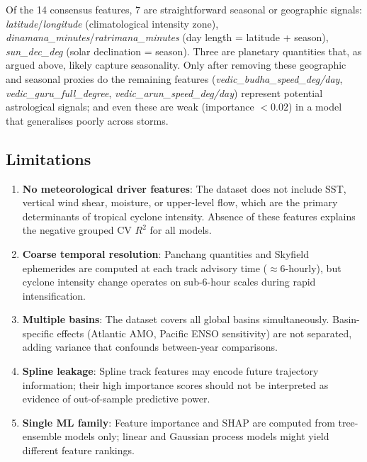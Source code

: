 \documentclass[12pt,a4paper]{article}
\begin{document}
Of the 14 consensus features, 7 are straightforward seasonal or geographic signals:
\textit{latitude}/\textit{longitude} (climatological intensity zone),
\textit{dinamana\_minutes}/\textit{ratrimana\_minutes} (day length = latitude + season),
\textit{sun\_dec\_deg} (solar declination = season).
Three are planetary quantities that, as argued above, likely capture seasonality.
Only after removing these geographic and seasonal proxies do the remaining features
(\textit{vedic\_budha\_speed\_deg/day}, \textit{vedic\_guru\_full\_degree},
\textit{vedic\_arun\_speed\_deg/day}) represent potential astrological signals;
and even these are weak (importance $< 0.02$) in a model that generalises poorly
across storms.

\subsection{Limitations}

\begin{enumerate}
  \item \textbf{No meteorological driver features}: The dataset does not include
        SST, vertical wind shear, moisture, or upper-level flow, which are the
        primary determinants of tropical cyclone intensity. Absence of these features
        explains the negative grouped CV $R^2$ for all models.
  \item \textbf{Coarse temporal resolution}: Panchang quantities and Skyfield
        ephemerides are computed at each track advisory time ($\approx 6$-hourly),
        but cyclone intensity change operates on sub-6-hour scales during rapid
        intensification.
  \item \textbf{Multiple basins}: The dataset covers all global basins simultaneously.
        Basin-specific effects (Atlantic AMO, Pacific ENSO sensitivity) are not
        separated, adding variance that confounds between-year comparisons.
  \item \textbf{Spline leakage}: Spline track features may encode future trajectory
        information; their high importance scores should not be interpreted as evidence
        of out-of-sample predictive power.
  \item \textbf{Single ML family}: Feature importance and SHAP are computed from
        tree-ensemble models only; linear and Gaussian process models might yield
        different feature rankings.
\end{enumerate}

\end{document}
